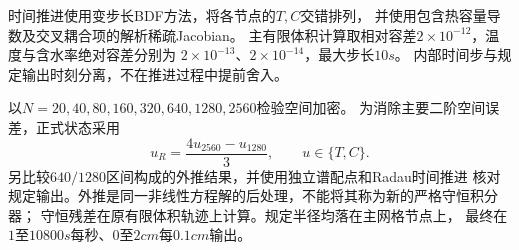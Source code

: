 时间推进使用变步长BDF方法\cite{scipy}，将各节点的$T,C$交错排列，
并使用包含热容量导数及交叉耦合项的解析稀疏Jacobian。
主有限体积计算取相对容差$2\times10^{-12}$，温度与含水率绝对容差分别为
$2\times10^{-13}$、$2\times10^{-14}$，最大步长$10\unit{s}$。
内部时间步与规定输出时刻分离，不在推进过程中提前舍入。

以$N=20,40,80,160,320,640,1280,2560$检验空间加密。
为消除主要二阶空间误差，正式状态采用
\begin{equation}
 u_R=\frac{4u_{2560}-u_{1280}}{3},\qquad u\in\{T,C\}.
\label{q2-eq-richardson}
\end{equation}
另比较$640/1280$区间构成的外推结果，并使用独立谱配点和Radau时间推进
核对规定输出。外推是同一非线性方程解的后处理，不能将其称为新的严格守恒积分器；
守恒残差在原有限体积轨迹上计算。规定半径均落在主网格节点上，
最终在$1$至$10800\unit{s}$每秒、$0$至$2\unit{cm}$每$0.1\unit{cm}$输出。
\FloatBarrier
